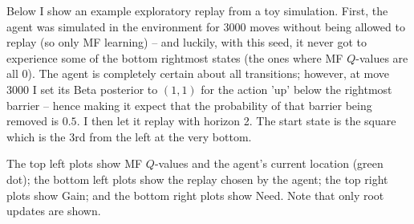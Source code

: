 \documentclass{article}
\begin{document}
Below I show an example exploratory replay from a toy simulation. First, the agent was simulated in the 
environment for 3000 moves without being allowed to replay (so only MF learning) -- and luckily, with 
this seed, it never got to experience some of the bottom rightmost states (the ones where MF $Q$-values are 
all 0). The agent is completely certain 
about all transitions; however, at move 3000 I set its Beta posterior to $(1, 1)$ for the action 'up' below 
the rightmost barrier -- hence making it expect that the probability of that barrier being removed is $0.5$.
I then let it replay with horizon 2. The start state is the square which is the 3rd from the left at the very bottom. 

\bigbreak

The top left plots show MF $Q$-values and the agent's current location (green dot); the bottom left plots show 
the replay chosen by the agent; the top right plots show Gain; and the bottom right plots show Need. Note that 
only root updates are shown.

\newpage
\end{document}

